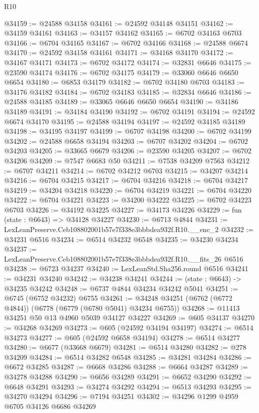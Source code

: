 \begin{lexlean}{R10}
\begin{coremodule}
@34159 := @24588 @34158
@34161 := @24592 @34148 @34151
@34162 := @34159 @34161
@34163 := @34157 @34162
@34165 := @6702 @34163 @6703
@34166 := @6704 @34165
@34167 := @6702 @34166
@34168 := @24588 @6674
@34170 := @24592 @34158 @34161
@34171 := @34168 @34170
@34172 := @34167 @34171
@34173 := @6702 @34172
@34174 := @32831 @6646
@34175 := @23590 @34174
@34176 := @6702 @34175
@34179 := @33060 @6646 @6650 @6654
@34180 := @6853 @34179
@34182 := @6702 @34180 @6703
@34183 := @34176 @34182
@34184 := @6702 @34183
@34185 := @32834 @6646
@34186 := @24588 @34185
@34189 := @33065 @6646 @6650 @6654
@34190 := @34186 @34189
@34191 := @34184 @34190
@34192 := @6702 @34191
@34194 := @24592 @6674 @34170
@34195 := @24588 @34194
@34197 := @24592 @34185 @34189
@34198 := @34195 @34197
@34199 := @6707 @34198
@34200 := @6702 @34199
@34202 := @24588 @6658 @34194
@34203 := @6707 @34202
@34204 := @6702 @34203
@34205 := @33665 @6679
@34206 := @23590 @34205
@34207 := @6702 @34206
@34209 := @7547 @6683 @50
@34211 := @7538 @34209 @7563
@34212 := @6707 @34211
@34214 := @6702 @34212 @6703
@34215 := @34207 @34214
@34216 := @6704 @34215
@34217 := @6704 @34216
@34218 := @6704 @34217
@34219 := @34204 @34218
@34220 := @6704 @34219
@34221 := @6704 @34220
@34222 := @6704 @34221
@34223 := @34200 @34222
@34225 := @6702 @34223 @6703
@34226 := @34192 @34225
@34227 := @34173 @34226
@34229 := fun (state : @6643) => @34128 @34227
@34230 := @6713 @4844
@34231 := LexLeanPreserve.Ceb108802001b57e7f338e3bbbdea932f.R10.__enc_2
@34232 := @34231 @6516
@34234 := @6514 @34232 @6548
@34235 := @34230 @34234
@34237 := LexLeanPreserve.Ceb108802001b57e7f338e3bbbdea932f.R10.__fits_26 @6516
@34238 := @6723 @34237
@34240 := LexLeanStd.Sha256.round @6516
@34241 := @34231 @34240
@34242 := @34238 @34241
@34244 := (state : @6643) -> @34235 @34242
@34248 := @6737 @4844 @34234 @34242 @5041
@34251 := @6745 (@6752 @34232) @6755
@34261 := @34248 @34251 (@6762 (@6772 @4844)) (@6778 (@6779 (@6780 @5041) @34234 @6755))
@34268 := @11413 @34251 @50 @13 @4960 @5039 @34127 @34227
@34269 := @605 @34137
@34270 := @34268 @34269
@34273 := @605 (@24592 @34194 @34197)
@34274 := @6514 @34273
@34277 := @605 (@24592 @6658 @34194)
@34278 := @6514 @34277
@34280 := @6677 (@33668 @6679)
@34281 := @6514 @34280
@34282 := @278 @34209
@34284 := @6514 @34282 @6548
@34285 := @34281 @34284
@34286 := @6672 @34285
@34287 := @6668 @34286
@34288 := @6664 @34287
@34289 := @34278 @34288
@34290 := @6656 @34289
@34291 := @6652 @34290
@34292 := @6648 @34291
@34293 := @34274 @34292
@34294 := @6513 @34293
@34295 := @34270 @34294
@34296 := @7194 @34251
@34302 := @34296 @1299 @4959 @6705 @34126 @6686 @34269

\end{coremodule}
\end{lexlean}
